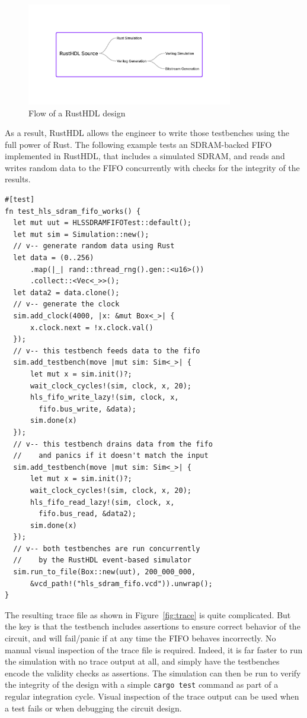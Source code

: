 \documentclass[conference]{IEEEtran}
\begin{document}
\begin{figure}[htbp]
  \centerline{\includegraphics[width=9cm]{flow.png}}
  \caption{Flow of a RustHDL design}
  \label{fig:flow}
\end{figure}


As a result, RustHDL allows the engineer to write those testbenches using 
the full power of Rust.  The following example tests an SDRAM-backed FIFO implemented in RustHDL, that
includes a simulated SDRAM, and reads and writes random data to the FIFO concurrently with checks for
the integrity of the results.

\begin{verbatim}
#[test]
fn test_hls_sdram_fifo_works() {
  let mut uut = HLSSDRAMFIFOTest::default();
  let mut sim = Simulation::new();
  // v-- generate random data using Rust
  let data = (0..256)
      .map(|_| rand::thread_rng().gen::<u16>())
      .collect::<Vec<_>>();
  let data2 = data.clone();
  // v-- generate the clock
  sim.add_clock(4000, |x: &mut Box<_>| {
      x.clock.next = !x.clock.val()
  });
  // v-- this testbench feeds data to the fifo
  sim.add_testbench(move |mut sim: Sim<_>| {
      let mut x = sim.init()?;
      wait_clock_cycles!(sim, clock, x, 20);
      hls_fifo_write_lazy!(sim, clock, x, 
        fifo.bus_write, &data);
      sim.done(x)
  });
  // v-- this testbench drains data from the fifo
  //    and panics if it doesn't match the input
  sim.add_testbench(move |mut sim: Sim<_>| {
      let mut x = sim.init()?;
      wait_clock_cycles!(sim, clock, x, 20);
      hls_fifo_read_lazy!(sim, clock, x, 
        fifo.bus_read, &data2);
      sim.done(x)
  });
  // v-- both testbenches are run concurrently
  //    by the RustHDL event-based simulator
  sim.run_to_file(Box::new(uut), 200_000_000, 
      &vcd_path!("hls_sdram_fifo.vcd")).unwrap();
}
\end{verbatim}

The resulting trace file as shown in Figure~\ref{fig:trace} is quite complicated.  But the key is that
the testbench includes assertions to ensure correct behavior of the circuit, and will fail/panic 
if at any time the FIFO behaves incorrectly.  No manual visual inspection of the trace file is
required.  Indeed, it is far faster to run the simulation with no trace output at all, and simply 
have the testbenches encode the validity checks as assertions. The 
simulation can then be run to verify the integrity of the design with a simple \verb|cargo test| command 
as part of a regular integration cycle.  Visual inspection of the trace output can be used when 
a test fails or when debugging the circuit design.
\end{document}
